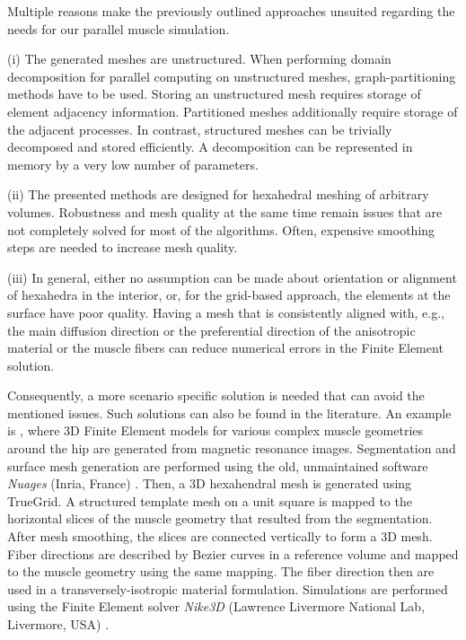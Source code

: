\nocite{Gregson2011}

Multiple reasons make the previously outlined approaches unsuited regarding the needs for our parallel muscle simulation. 

(i) The generated meshes are unstructured. When performing domain decomposition for parallel computing on unstructured meshes, graph-partitioning methods have to be used. Storing an unstructured mesh requires storage of element adjacency information. Partitioned meshes additionally require storage of the adjacent processes. In contrast, structured meshes can be trivially decomposed and stored efficiently. A decomposition can be represented in memory by a very low number of parameters.

(ii) The presented methods are designed for hexahedral meshing of arbitrary volumes. Robustness and mesh quality at the same time remain issues that are not completely solved for most of the algorithms. Often, expensive smoothing steps are needed to increase mesh quality.

(iii) In general, either no assumption can be made about orientation or alignment of hexahedra in the interior, or, for the grid-based approach, the elements at the surface have poor quality. Having a mesh that is consistently aligned with, e.g., the main diffusion direction or the preferential direction of the anisotropic material or the muscle fibers can reduce numerical errors in the Finite Element solution.

Consequently, a more scenario specific solution is needed that can avoid the mentioned issues. Such solutions can also be found in the literature. An example is \cite{blemker2005three}, where 3D Finite Element models for various complex muscle geometries around the hip are generated from magnetic resonance images. Segmentation and surface mesh generation are performed using the old, unmaintained software \emph{Nuages} (Inria, France) \cite{Nuages}.
Then, a 3D hexahendral mesh is generated using TrueGrid. A structured template mesh on a unit square is mapped to the horizontal slices of the muscle geometry that resulted from the segmentation. After mesh smoothing, the slices are connected vertically to form a 3D mesh. 
Fiber directions are described by Bezier curves in a reference volume and mapped to the muscle geometry using the same mapping. The fiber direction then are used in a transversely-isotropic material formulation. Simulations are performed using the Finite Element solver \emph{Nike3D} (Lawrence Livermore National Lab, Livermore, USA) \cite{Nike3D}.

